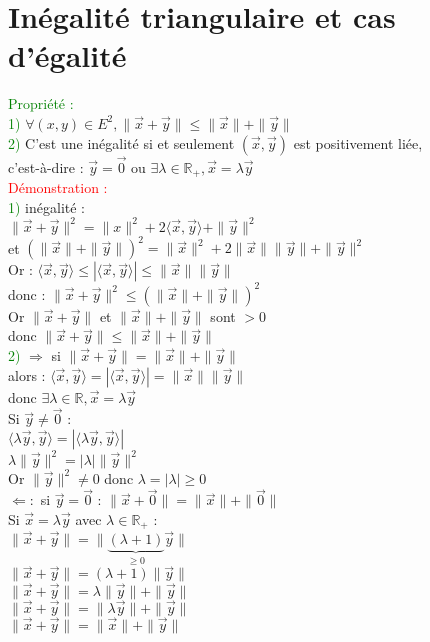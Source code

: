 \documentclass{article}
\begin{document}
\section{Inégalité triangulaire et cas d'égalité}
\textcolor{green}{Propriété :} \\
\textcolor{green}{1)} $\forall (x,y) \in E^2, \| \vec x + \vec y \| \leq \| \vec x \| + \| \vec y \|$ \\
\textcolor{green}{2)} C'est une inégalité si et seulement $(\vec x, \vec y)$ est positivement liée, \\
c'est-à-dire : $\vec y =\vec 0$ ou $\exists \lambda \in \mathbb R_+, \vec x= \lambda \vec y$ \\
\textcolor{red}{Démonstration :} \\
\textcolor{green}{1)} inégalité : \\
$\| \vec x + \vec y \|^2= \|x \|^2+ 2 \langle \vec x, \vec y \rangle + \| \vec y \|^2 $ \\
et $(\| \vec x \| + \| \vec y \|)^2= \| \vec x \|^2 + 2 \| \vec x \| \| \vec y \| + \| \vec y \|^2$ \\
Or : $\langle \vec x, \vec y \rangle \leq | \langle \vec x , \vec y \rangle | \leq \| \vec x \| \| \vec y \|$ \\
donc : $\| \vec x + \vec y \|^2\leq (\| \vec x \| + \| \vec y \|)^2$ \\
Or $\| \vec x + \vec y \|$ et $\| \vec x \| + \| \vec y \|$ sont $>0$ \\
donc $\| \vec x +\vec y \| \leq \| \vec x \| + \| \vec y \|$ \\
\textcolor{green}{2)} $\Rightarrow$ si $\| \vec x + \vec y \|= \| \vec x \| + \| \vec y \|$ \\
alors : $\langle \vec x, \vec y \rangle = | \langle \vec x, \vec y \rangle |= \| \vec x \| \| \vec y \|$ \\
donc $\exists \lambda \in \mathbb R ,\vec x = \lambda \vec y$ \\
Si $\vec y \neq \vec 0$ : \\
$\langle \lambda \vec y, \vec y \rangle = | \langle \lambda \vec y,\vec y \rangle |$ \\
$\lambda \| \vec y \|^2= |\lambda| \| \vec y \|^2$ \\
Or $\| \vec y \|^2 \neq 0$ donc $\lambda=|\lambda|\geq 0$ \\
$\Leftarrow :$ si $\vec y= \vec 0$ : $\|\vec x + \vec 0 \|= \| \vec x \| + \| \vec 0 \|$ \\
Si $\vec x = \lambda \vec y$ avec $\lambda \in \mathbb R_+$ : \\
$\| \vec x + \vec y \| = \| \underbrace{(\lambda +1)}_{\geq 0} \vec y \|$ \\
$\| \vec x + \vec y \| = (\lambda + 1) \| \vec y \|$ \\
$\| \vec x + \vec y \| = \lambda \|\vec y \| + \| \vec y \|$ \\
$\| \vec x + \vec y \| = \| \lambda \vec y \| + \| \vec y \|$ \\
$\| \vec x + \vec y \| = \| \vec x \| + \| \vec y \|$
\end{document}
